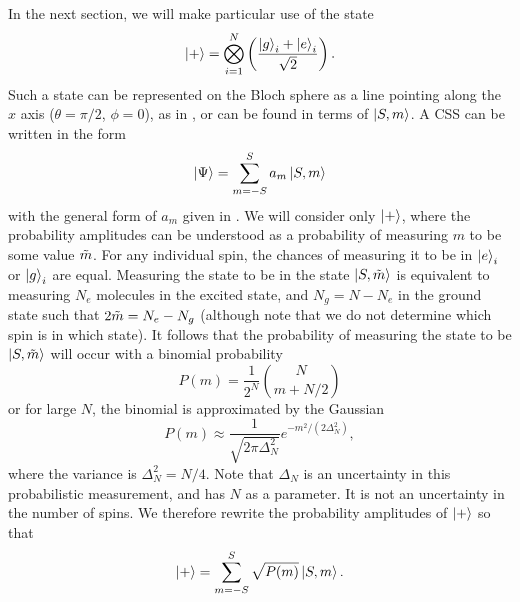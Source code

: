 In the next section, we will make particular use of the state
%
\begin{equation}
  \ket{+} = \bigotimes_{i=1}^N \left(\frac{\ket{g}_i +
  \ket{e}_i}{\sqrt{2}}\right).
\end{equation}
%
Such a state can be represented on the Bloch sphere as a line pointing along
the $x$ axis ($\theta=\pi/2$, $\phi=0$), as in , or
can be found in terms of $\ket{S,m}$. A CSS can be written in the form 
%
\begin{equation}
  \ket{\Psi} = \sum_{m=-S}^S a_m \ket{S, m}
\end{equation}
%
with the general form of $a_m$ given in . We will
consider only $\ket{+}$, where the probability amplitudes can be understood as
a probability of measuring $m$ to be some value $\tilde{m}$.
%
For any individual spin, the chances of measuring it to be in $\ket{e}_i$ or
$\ket{g}_i$ are equal. Measuring the state to be in the state $\ket{S, \tilde{m}}$
is equivalent to measuring $N_e$ molecules in the excited state, and $N_g = N -
N_e$ in the ground state such that $2\tilde{m} = N_e - N_g$ (although note that
we do not determine which spin is in which state). It follows that the
probability of measuring the state to be $\ket{S,\tilde{m}}$ will occur with a
binomial probability~\cite{Gazeau2009}
%
\begin{equation}
  P(m) = \frac{1}{2^N} \binom{N}{m+N/2}
  \label{squeeze:eqn:binprob}
\end{equation}
%
or for large $N$, the binomial is approximated by the Gaussian
%
\begin{equation}
  P(m) \approx\frac{1}{\sqrt{2\pi \Delta_N^2}} e^{-m^2/(2\Delta_N^2)},
  \label{squeeze:eqn:CSSmprob}
\end{equation}
%
where the variance is $\Delta_N^2 = N/4$. Note that $\Delta_N$ is an
uncertainty in this probabilistic measurement, and has $N$ as a parameter. It
is not an uncertainty in the number of spins. We therefore rewrite the
probability amplitudes of $\ket{+}$ so that
%
\begin{equation}
  \ket{+} = \sum_{m=-S}^S \sqrt{P(m)}\ket{S,m}.
  \label{squeeze:eqn:plusdicke}
\end{equation}

